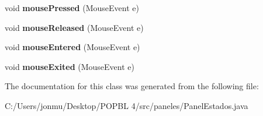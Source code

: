 \begin{DoxyCompactItemize}
void {\bfseries mouse\+Pressed} (Mouse\+Event e)
\item 
\mbox{\label{classpaneles_1_1_panel_estados_a1a35a3b4c3144a440153fccd3da616fd}} 
void {\bfseries mouse\+Released} (Mouse\+Event e)
\item 
\mbox{\label{classpaneles_1_1_panel_estados_a6636a93391632082ad778cea6d6189b7}} 
void {\bfseries mouse\+Entered} (Mouse\+Event e)
\item 
\mbox{\label{classpaneles_1_1_panel_estados_a1e46995f291f6fbbb7686c141a24d4da}} 
void {\bfseries mouse\+Exited} (Mouse\+Event e)
\end{DoxyCompactItemize}


The documentation for this class was generated from the following file\+:\begin{DoxyCompactItemize}
\item 
C\+:/\+Users/jonmu/\+Desktop/\+P\+O\+P\+B\+L 4/src/paneles/Panel\+Estados.\+java\end{DoxyCompactItemize}
